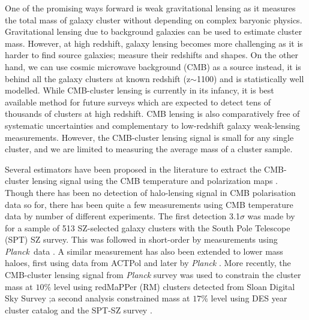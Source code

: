 \documentclass[twocolumn]{aastex61}
\newcommand{\planck}{{\it Planck}}
\begin{document}
One of the promising ways forward is weak gravitational lensing as it measures the total mass of galaxy cluster without depending on complex baryonic physics. Gravitational lensing due to background galaxies \citep{henk13}can be used to estimate cluster mass. However, at high redshift, galaxy lensing becomes more challenging as it is harder to find source galaxies; measure their redshifts and shapes. On the other hand, we can use cosmic microwave background (CMB) as a source instead, it is behind all the galaxy clusters at known redshift (z$ \sim $1100) and is statistically well modelled. While CMB-cluster lensing is currently in its infancy, it is best available method for future surveys \citep{lsst09, erosita12, benson14, henderson16, cmbs4-sb1} which are expected to detect tens of thousands of clusters at high redshift. CMB lensing is also comparatively free of systematic uncertainties and complementary to low-redshift galaxy weak-lensing measurements. However, the CMB-cluster lensing signal is small for any single cluster, and we are limited to measuring the average mass of a cluster sample.

Several estimators have been proposed in the literature to extract the CMB-cluster lensing signal using the CMB temperature and polarization maps \citep{seljak00b, dodelson04, holder04, maturi05, lewis06,  hu07, yoo08, yoo10, melin15}. Though there has been no detection of halo-lensing signal in CMB polarisation data so for, there has been quite a few measurements using CMB temperature data by number of different experiments. The first detection 3.1$\sigma$ was made by \citet{baxter15} for a sample of 513 SZ-selected galaxy clusters with the South Pole Telescope (SPT) SZ survey. This was followed in short-order by measurements using  \planck\ data \citet{placksz15}. A similar measurement has also been extended to lower mass haloes, first using data from ACTPol \citep{matthew15} and later by {\it Planck} \citep{raghunathan17b}.  More recently, the CMB-cluster lensing signal from {\it Planck} survey was used to constrain the cluster mass at $10\%$ level using redMaPPer (RM) clusters detected from Sloan Digital Sky Survey \citep{geach17} ;a second analysis constrained mass at $17\%$  level using DES year cluster catalog and the SPT-SZ survey \citep[hereafter ]{baxter18}. 
\end{document}
